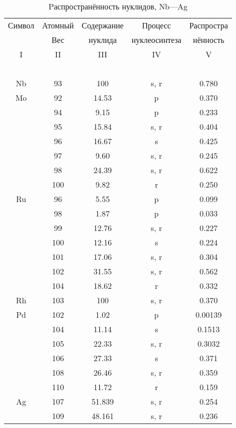 \documentclass[a5paper,openany]{book}
\begin{document}
\begin{table}[h!]
	{\small
		\begin{tabular}{ccccc}
			Символ  & Атомный &  Содержание  & Процесс & Распростра   \\
			~ & Вес &  нуклида  &  нуклеосинтеза  & нённость  \\
			\hline 
			I & II &  III  & IV & V \\
			\hline 
			~ & ~ & ~ & ~ & ~  \\
			Nb & 93 & 100 & s, r &  0.780 \\ [1mm]
			Mo & 92 & 14.53 & p & 0.370 \\ [1mm]
			& 94 & 9.15 & p & 0.233 \\ [1mm] 
			& 95 &  15.84 & s, r & 0.404 \\ [1mm]  			
			& 96 & 16.67 & s & 0.425 \\ [1mm]			
			& 97 & 9.60 & s, r & 0.245 \\ [1mm]			
			& 98 & 24.39 & s, r & 0.622 \\ [1mm]				
			& 100 & 9.82 & r & 0.250 \\ [1mm]			
			Ru & 96 & 5.55 & p & 0.099 \\ [1mm]
			& 98 & 1.87 & p & 0.033 \\ [1mm] 
			& 99 &  12.76 & s, r & 0.227 \\ [1mm]  			
			& 100 & 12.16 & s & 0.224 \\ [1mm]			
			& 101 & 17.06 & s, r & 0.304 \\ [1mm]			
			& 102 & 31.55 & s, r & 0.562 \\ [1mm]				
			& 104 & 18.62 & r & 0.332 \\ [1mm]			
			Rh & 103 & 100 & s, r &  0.370 \\ [1mm]		
			Pd & 102 & 1.02 & p & 0.00139 \\ [1mm]
			& 104 & 11.14 & s & 0.1513 \\ [1mm] 
			& 105 &  22.33 & s, r & 0.3032 \\ [1mm]  			
			& 106 & 27.33 & s & 0.371 \\ [1mm]			
			& 108 & 26.46 & s, r & 0.359 \\ [1mm]			
			& 110 & 11.72 & r & 0.159 \\ [1mm]				
			Ag & 107 & 51.839 & s, r & 0.254 \\ [1mm]		
			& 109 & 48.161 & s, r & 0.236 \\ [1mm]		
			\hline 
		\end{tabular}
	}
	\caption{Pаспространённость нуклидов, Nb---Ag}
	\label{t:AbudanceSolarNbAg}
\end{table}
\end{document}
